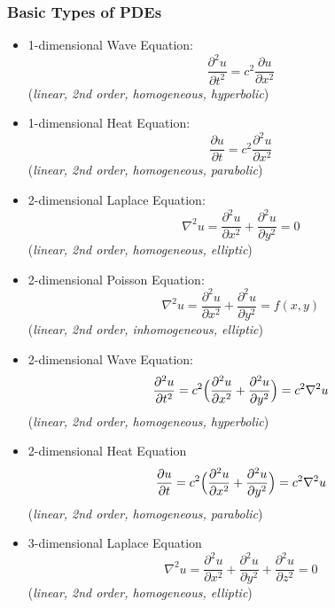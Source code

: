 \subsubsection{Basic Types of PDEs}
\begin{itemize}
    \item 1-dimensional Wave Equation:
          \begin{equation*}
              \frac{\partial ^2 u}{\partial t^2} = c^2\frac{\partial u}{\partial x^2}
          \end{equation*}
          (\textit{linear, 2nd order, homogeneous, hyperbolic})
    \item 1-dimensional Heat Equation:
          \begin{equation*}
              \frac{\partial u}{\partial t} = c^2 \frac{\partial ^2 u}{\partial x^2}
          \end{equation*}
          (\textit{linear, 2nd order, homogeneous, parabolic})
    \item 2-dimensional Laplace Equation:
          \begin{equation*}
              \nabla^2 u=\frac{\partial^2 u}{\partial x^2}+\frac{\partial ^2 u}{\partial y^2}=0
          \end{equation*}
          (\textit{linear, 2nd order, homogeneous, elliptic})
    \item 2-dimensional Poisson Equation:
          \begin{equation*}
              \nabla^2 u=\frac{\partial^2 u}{\partial x^2}+\frac{\partial^2 u}{\partial y^2}=f(x,y)
          \end{equation*}
          (\textit{linear, 2nd order, inhomogeneous, elliptic})
    \item 2-dimensional Wave Equation:
          \begin{equation*}
              \frac{\partial^2u}{\partial t^2}=c^2 \Bigl(\frac{\partial^2 u}{\partial x^2}+\frac{\partial ^2 u}{\partial y^2}\Bigr)=c^2\nabla^2 u
          \end{equation*}
          (\textit{linear, 2nd order, homogeneous, hyperbolic})
    \item 2-dimensional Heat Equation
          \begin{equation*}
              \frac{\partial u}{\partial t}=c^2\Bigl(\frac{\partial^2 u}{\partial x^2}+\frac{\partial ^2 u}{\partial y^2}\Bigr)=c^2\nabla^2 u
          \end{equation*}
          (\textit{linear, 2nd order, homogeneous, parabolic})
    \item 3-dimensional Laplace Equation
          \begin{equation*}
              \nabla^2 u=\frac{\partial^2 u}{\partial x^2}+\frac{\partial ^2 u}{\partial y^2}+\frac{\partial ^2 u}{\partial z^2}=0
          \end{equation*}
          (\textit{linear, 2nd order, homogeneous, elliptic})
\end{itemize}

